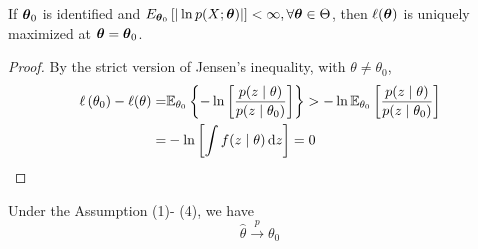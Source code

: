 \begin{lemma}
	If \(\boldsymbol{\theta}_{0}\) is identified and \(E_{\boldsymbol{\theta}_{0}}\left[|\ln p(X;\boldsymbol{\theta})|\right]<\infty,\forall\boldsymbol{\theta}\in\Theta\), then \(\ell(\boldsymbol{\theta})\) is uniquely maximized at \(\boldsymbol{\theta}=\boldsymbol{\theta}_{0}\).
\end{lemma}

\begin{proof}
	By the strict version of Jensen's inequality, with \(\theta\neq\theta_{0}\),
	\begin{equation*}
		\begin{aligned}
			\ell\left(\theta_{0}\right)-\ell(\theta)= & \mathbb{E}_{\theta_{0}}\left\{-\ln\left[\frac{p(z\mid\theta)}{p(z\mid\theta_{0})}\right]\right\}>-\ln\mathbb{E}_{\theta_{0}}\left[\frac{p(z\mid\theta)}{p(z\mid\theta_{0})}\right] \\
			=                                         & -\ln \left[\int f(z \mid \theta) \mathop{}\!\mathrm{d} z\right]=0
		\end{aligned}
	\end{equation*}
\end{proof}

\begin{theorem}
	Under the Assumption (1)- (4), we have
	\begin{equation}
		\hat{\theta}\stackrel{p}{\rightarrow}\theta_{0}
	\end{equation}
\end{theorem}

